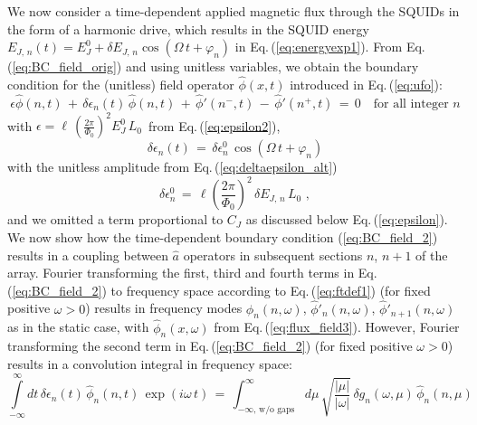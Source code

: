 \noindent
We now consider a time-dependent applied magnetic flux through the SQUIDs
in the form of a harmonic drive, which results in the SQUID energy 
$E_{J,\,n}(t) = E_J^0 + \delta E_{J,\,n} \cos(\Omega \, t + \varphi_n)$
in Eq.\,(\ref{eq:energyexp1}). 
From Eq.\,(\ref{eq:BC_field_orig}) and using unitless variables, we obtain the boundary 
condition for the (unitless) field operator $\hat{\phi}(x,t)$ introduced in Eq.\,(\ref{eq:ufo}): 
%
\begin{equation}\label{eq:BC_field_2}
\epsilon \hat{\phi}(n,t) \, + \, \delta \epsilon_n(t) \, \hat{\phi}(n,t) \, + \,
\hat{\phi}'(n^-,t) \, - \, \hat{\phi}'(n^+,t) \, = \, 0 
\quad \text{for all integer} \, \, n
\end{equation}
%
with 
$\epsilon = \ell \, \displaystyle{\left(\frac{2 \pi}{\Phi_{0}}\right)^{2}} E_J^0 \, L_0\,$
from Eq.\,(\ref{eq:epsilon2}), 
%
\begin{equation} \label{eq:deltaepsilon}
\delta \epsilon_n(t) \, = \, \delta \epsilon_n^0 \, \cos(\Omega \, t + \varphi_n)
\end{equation} 
%
with the unitless amplitude from Eq.\,(\ref{eq:deltaepsilon_alt})
%
\begin{equation} \label{eq:deltaepsilon2}
    \delta \epsilon_n^0 \, = \, \ell \left(\frac{2 \pi}{\Phi_{0}}\right)^{2} \,
\delta E_{J,\,n} \, L_0 \, \, ,
\end{equation}
%
and we omitted a term proportional to $C_J$ as discussed below
Eq.\,(\ref{eq:epsilon}).
\newpage
We now show how the time-dependent boundary condition (\ref{eq:BC_field_2}) results in a 
coupling between $\hat{a}$ operators in subsequent sections $n$, $n+1$
of the array. 
Fourier transforming the first, third and fourth terms in Eq.\,(\ref{eq:BC_field_2}) to 
frequency space according to Eq.\,(\ref{eq:ftdef1}) (for fixed positive $\omega>0$) 
results in frequency modes $\hat{\phi}_n(n,\omega)$,
$\hat{\phi}'_n(n,\omega)$, $\hat{\phi}'_{n+1}(n,\omega)$ as in the 
static case, with $\hat{\phi}_n(x,\omega)$ from Eq.\,(\ref{eq:flux_field3}). 
%
However, Fourier transforming the second term in Eq.\,(\ref{eq:BC_field_2}) 
(for fixed positive $\omega>0$) results in a convolution integral in frequency space:
%
\begin{equation} \label{eq:conv}
\int\limits_{-\infty}^{\infty} dt \, \delta \epsilon_n(t) \, \hat{\phi}_n(n,t) \, \exp(i \omega \, t) \, = \,
\int_{-\infty, \, \text{w/o gaps}}^{\infty} d\mu \, \sqrt{\frac{|\mu|}{|\omega|}} \, 
\delta g_n(\omega, \mu) \, \hat{\phi}_n(n,\mu)
\end{equation}
